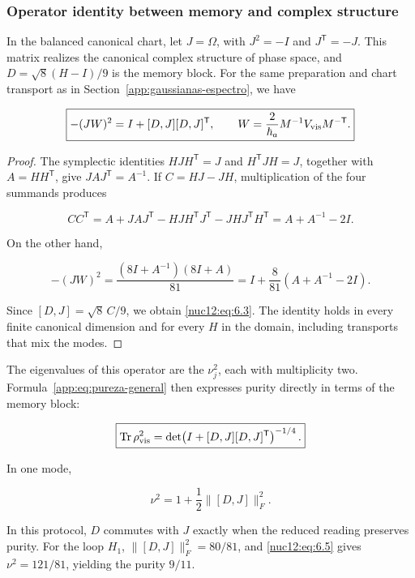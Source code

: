 \subsubsection{Operator identity between memory and complex structure}

In the balanced canonical chart, let \(J=\Omega\), with \(J^2=-I\) and \(J^{\mathsf T}=-J\). This matrix realizes the canonical complex structure of phase space, and \(D=\sqrt8(H-I)/9\) is the memory block. For the same preparation and chart transport as in Section~\ref{app:gaussianas-espectro}, we have

\begin{equation}
\boxed{-(JW)^2=I+[D,J][D,J]^{\mathsf T},\qquad
W=\frac{2}{\hbar_a}M^{-1}V_{\rm vis}M^{-\mathsf T}.}
\label{nuc12:eq:6.3}
\end{equation}

\begin{proof}
The symplectic identities \(HJH^{\mathsf T}=J\) and \(H^{\mathsf T}JH=J\), together with \(A=HH^{\mathsf T}\), give \(JAJ^{\mathsf T}=A^{-1}\). If \(C=HJ-JH\), multiplication of the four summands produces

\[
CC^{\mathsf T}
=A+JAJ^{\mathsf T}
-HJH^{\mathsf T}J^{\mathsf T}
-JHJ^{\mathsf T}H^{\mathsf T}
=A+A^{-1}-2I.
\]

On the other hand,

\[
-(JW)^2
=\frac{(8I+A^{-1})(8I+A)}{81}
=I+\frac8{81}(A+A^{-1}-2I).
\]

Since \([D,J]=\sqrt8\,C/9\), we obtain \eqref{nuc12:eq:6.3}. The identity holds in every finite canonical dimension and for every \(H\) in the domain, including transports that mix the modes.
\end{proof}

The eigenvalues of this operator are the \(\nu_j^2\), each with multiplicity two. Formula~\eqref{app:eq:pureza-general} then expresses purity directly in terms of the memory block:

\begin{equation}
\boxed{\operatorname{Tr}\rho_{\rm vis}^2
=\det\!\left(I+[D,J][D,J]^{\mathsf T}\right)^{-1/4}.}
\label{nuc12:eq:6.4}
\end{equation}

In one mode,

\begin{equation}
\nu^2=1+\frac12\|[D,J]\|_F^2.
\label{nuc12:eq:6.5}
\end{equation}

In this protocol, \(D\) commutes with \(J\) exactly when the reduced reading preserves purity. For the loop \(H_1\), \(\|[D,J]\|_F^2=80/81\), and \eqref{nuc12:eq:6.5} gives \(\nu^2=121/81\), yielding the purity \(9/11\).

